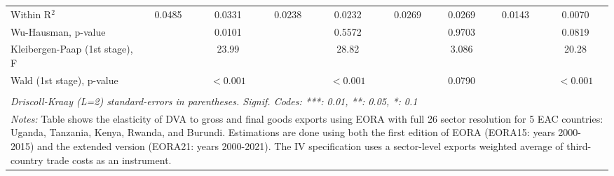 \documentclass[a4paper]{article}
\begin{document}
\begin{table}[h!]
{\begin{tabular}{lcccccccc}
      Within R$^2$                        & 0.0485         & 0.0331                & 0.0238         & 0.0232                & 0.0269         & 0.0269        & 0.0143         & 0.0070\\  
      Wu-Hausman, p-value                 &                & 0.0101                &                & 0.5572                &                & 0.9703        &                & 0.0819\\  
      Kleibergen-Paap (1st stage), F &           & 23.99                 &                & 28.82                 &                & 3.086         &                & 20.28\\  
      Wald (1st stage), p-value   &                & $<0.001$              &                & $<0.001$              &                & 0.0790               &   & $<0.001$             \\  
      \bottomrule \\ [-0.9em]
      \multicolumn{9}{l}{\emph{Driscoll-Kraay (L=2) standard-errors in parentheses. Signif. Codes: ***: 0.01, **: 0.05, *: 0.1}}\\
      \multicolumn{9}{l}{\parbox{1.25\textwidth}{\scriptsize
\textit{Notes:} Table shows the elasticity of DVA to gross and final goods exports using EORA with full 26 sector resolution for 5 EAC countries: Uganda, Tanzania, Kenya, Rwanda, and Burundi. Estimations are done using both the first edition of EORA (EORA15: years 2000-2015) and the extended version (EORA21: years 2000-2021). The IV specification uses a sector-level exports weighted average of third-country trade costs as an instrument.  }}
   \end{tabular}
   }
\end{table}
\FloatBarrier
\end{document}
